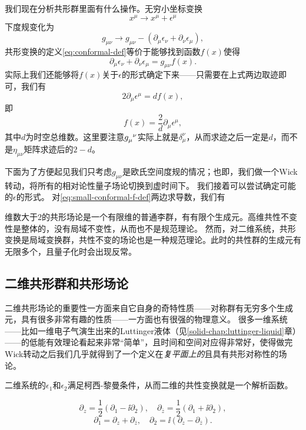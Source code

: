 我们现在分析共形群里面有什么操作。无穷小坐标变换
\[
    x^\mu \longrightarrow x^\mu + \epsilon^\mu
\]
下度规变化为
\begin{equation}
    g_{\mu \nu} \longrightarrow g_{\mu \nu} - (\partial_\mu \epsilon_\nu + \partial_\nu \epsilon_\mu),
\end{equation}
共形变换的定义\eqref{eq:conformal-def}等价于能够找到函数$f(x)$使得
\begin{equation}
    \partial_\mu \epsilon_\nu + \partial_\nu \epsilon_\mu = g_{\mu \nu} f(x).
    \label{eq:small-conformal-f-def}
\end{equation}
实际上我们还能够将$f(x)$关于$\epsilon$的形式确定下来——只需要在上式两边取迹即可，我们有
\[
    2 \partial_\mu \epsilon^\mu = d f(x),
\]
即
\begin{equation}
    f(x) = \frac{2}{d} \partial_\mu \epsilon^\mu,
\end{equation}
其中$d$为时空总维数。这里要注意$g\indices{_\mu^\nu}$实际上就是$\delta_\mu^\nu$，从而求迹之后一定是$d$，而不是$\eta_{\mu \nu}$矩阵求迹后的$2-d$。

下面为了方便起见我们只考虑$g_{\mu \nu}$是欧氏空间度规的情况；也即，我们做一个Wick转动，将所有的相对论性量子场论切换到虚时间下。
我们接着可以尝试确定可能的$\epsilon$的形式。
对\eqref{eq:small-conformal-f-def}两边求导数，我们有


维数大于2的共形场论是一个有限维的普通李群，有有限个生成元。高维共性不变性是整体的，没有局域不变性，从而也不是规范理论。
然而，对二维系统，共形变换是局域变换群，共性不变的场论也是一种规范理论。此时的共性群的生成元有无限多个，且量子化时会出现反常。

\subsection{二维共形群和共形场论}

二维共形场论的重要性一方面来自它自身的奇特性质——对称群有无穷多个生成元，具有很多非常有趣的性质——一方面也有很强的物理意义。
很多一维系统——比如一维电子气演生出来的Luttinger液体（见\ref{solid-chap:luttinger-liquid}章）——的低能有效理论看起来非常“简单”，且时间和空间对应得非常好，使得做完Wick转动之后我们几乎就得到了一个定义在\emph{复平面上的}且具有共形对称性的场论。

二维系统的$\epsilon_1$和$\epsilon_2$满足柯西-黎曼条件，从而二维的共性变换就是一个解析函数。

\begin{equation}
    \partial_z = \frac{1}{2} (\partial_1 - \ii \partial_2), \quad \partial_{\bar{z}} = \frac{1}{2} (\partial_1 + \ii \partial_2),
\end{equation}
\begin{equation}
    \partial_1 = \partial_z + \partial_{\bar{z}}, \quad \partial_2 = \ii (\partial_z - \partial_{\bar{z}}).
\end{equation}

